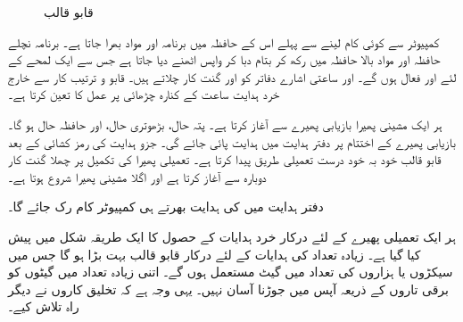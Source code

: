 \begin{figure}
\caption{قابو قالب}
\label{شکل_کمپیوٹر_قابو_دور}
\end{figure}

کمپیوٹر سے کوئی کام لینے سے پہلے اس کے حافظہ میں  برنامہ  اور مواد بھرا جاتا ہے۔ برنامہ نچلے حافظہ اور مواد بالا حافظہ میں رکھ کر   بتام  دبا کر واپس  اٹھنے دیا جاتا ہے جس سے ایک لمحے کے لئے   اور  فعال ہوں گے۔  اور  ساعتی اشارے دفاتر کو  اور گنت کار چلاتے ہیں۔ قابو و ترتیب کار سے خارج  خرد ہدایت  ساعت کے کنارہ چڑھائی پر   عمل کا تعین کرتا ہے۔

ہر ایک  مشینی  پھیرا  بازیابی پھیرے سے آغاز کرتا ہے۔  پتہ حال،  بڑھوتری حال، اور  حافظہ حال ہو گا۔ بازیابی پھیرے کے اختتام پر  دفتر ہدایت میں ہدایت پائی جائے گی۔  جزو ہدایت   کی رمز کشائی کے بعد  قابو قالب خود بہ خود   درست تعمیلی طریق پیدا کرتا ہے۔ تعمیلی پھیرا  کی تکمیل   پر چھلا گنت کار دوبارہ  سے آغاز کرتا ہے اور اگلا مشینی پھیرا شروع ہوتا ہے۔

دفتر ہدایت میں   کی ہدایت    بھرتے ہی  کمپیوٹر کام  رک جائے گا۔

ہر ایک تعمیلی پھیرے کے لئے درکار خرد ہدایات  کے حصول کا ایک طریقہ شکل  میں پیش کیا گیا ہے۔ زیادہ تعداد کی  ہدایات  کے لئے درکار قابو قالب بہت بڑا ہو گا جس میں سیکڑوں یا ہزاروں کی تعداد میں گیٹ مستعمل ہوں گے۔ اتنی زیادہ تعداد میں گیٹوں کو برقی تاروں کے ذریعہ آپس میں جوڑنا آسان نہیں۔ یہی وجہ ہے کہ تخلیق کاروں نے دیگر راہ تلاش کیے۔

